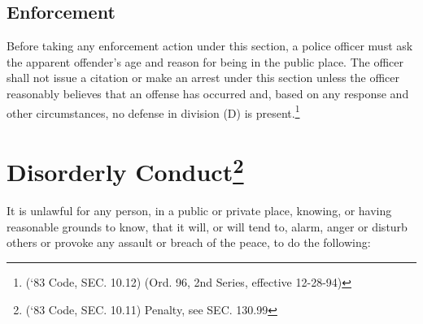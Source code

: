 \subsection{Enforcement}  Before taking any enforcement action under this section, a police officer must ask the apparent offender’s age and reason for being in the public place.  The officer shall not issue a citation or make an arrest under this section unless the officer reasonably believes that an offense has occurred and, based on any response and other circumstances, no defense in division (D) is present.\footnote{(‘83 Code, SEC. 10.12)  (Ord. 96, 2nd Series, effective 12-28-94)}

\section{Disorderly Conduct\footnote{(‘83 Code, SEC. 10.11)  Penalty, see SEC. 130.99}}
It is unlawful for any person, in a public or private place, knowing, or having reasonable grounds to know, that it will, or will tend to, alarm, anger or disturb others or provoke any assault or breach of the peace, to do the following:
